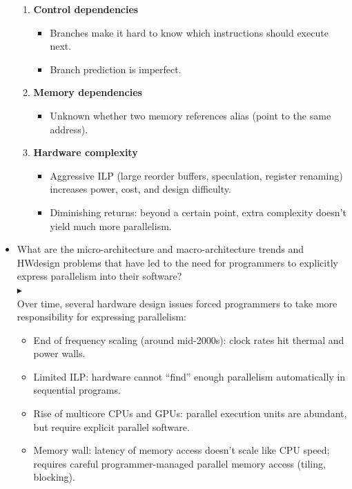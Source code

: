 \documentclass[12pt]{article}
\begin{document}
\begin{itemize}[left = 0pt]
\begin{enumerate}
        \item  \textbf{Control dependencies}
        \begin{itemize}
            \item Branches make it hard to know which instructions should execute next.
            \item Branch prediction is imperfect.
        \end{itemize}

        \item  \textbf{Memory dependencies}
        \begin{itemize}
            \item Unknown whether two memory references alias (point to the same address).
        \end{itemize}
        \item \textbf{Hardware complexity}
        \begin{itemize}
            \item Aggressive ILP (large reorder buffers, speculation, register renaming) increases power, cost, and design difficulty.
            \item Diminishing returns: beyond a certain point, extra complexity doesn’t yield much more parallelism.
        \end{itemize}        
    \end{enumerate}

    \item What are the micro-architecture and  macro-architecture trends and HWdesign problems that have led to the need for programmers to explicitly express parallelism into their software?\\
    $\blacktriangleright$\\
    Over time, several hardware design issues forced programmers to take more responsibility for expressing parallelism:
    \begin{itemize} 
        \item End of frequency scaling (around mid-2000s): clock rates hit thermal and power walls.
        \item Limited ILP: hardware cannot “find” enough parallelism automatically in sequential programs.
        \item Rise of multicore CPUs and GPUs: parallel execution units are abundant, but require explicit parallel software.
        \item Memory wall: latency of memory access doesn’t scale like CPU speed; requires careful programmer-managed parallel memory access (tiling, blocking). 
    \end{itemize}



\end{itemize}
\end{document}
